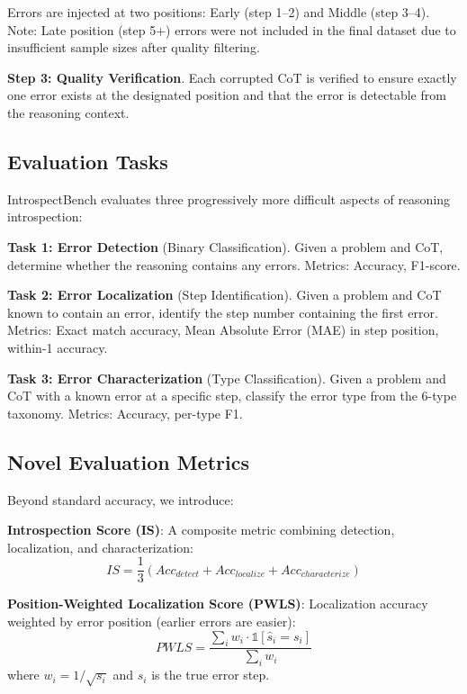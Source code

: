 \documentclass{article}
\begin{document}
Errors are injected at two positions: Early (step 1--2) and Middle (step 3--4). Note: Late position (step 5+) errors were not included in the final dataset due to insufficient sample sizes after quality filtering.

\textbf{Step 3: Quality Verification}. Each corrupted CoT is verified to ensure exactly one error exists at the designated position and that the error is detectable from the reasoning context.

\subsection{Evaluation Tasks}

IntrospectBench evaluates three progressively more difficult aspects of reasoning introspection:

\textbf{Task 1: Error Detection} (Binary Classification). Given a problem and CoT, determine whether the reasoning contains any errors. Metrics: Accuracy, F1-score.

\textbf{Task 2: Error Localization} (Step Identification). Given a problem and CoT known to contain an error, identify the step number containing the first error. Metrics: Exact match accuracy, Mean Absolute Error (MAE) in step position, within-1 accuracy.

\textbf{Task 3: Error Characterization} (Type Classification). Given a problem and CoT with a known error at a specific step, classify the error type from the 6-type taxonomy. Metrics: Accuracy, per-type F1.

\subsection{Novel Evaluation Metrics}

Beyond standard accuracy, we introduce:

\textbf{Introspection Score (IS)}: A composite metric combining detection, localization, and characterization:
\begin{equation}
IS = \frac{1}{3}(Acc_{detect} + Acc_{localize} + Acc_{characterize})
\end{equation}

\textbf{Position-Weighted Localization Score (PWLS)}: Localization accuracy weighted by error position (earlier errors are easier):
\begin{equation}
PWLS = \frac{\sum_{i} w_i \cdot \mathbb{1}[\hat{s}_i = s_i]}{\sum_i w_i}
\end{equation}
where $w_i = 1/\sqrt{s_i}$ and $s_i$ is the true error step.
\end{document}
